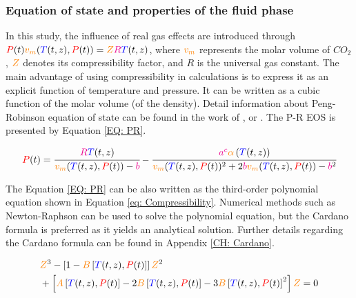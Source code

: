 \documentclass[../Article_Model_Parameters.tex]{subfiles}
\begin{document}
	
	\label{CH: Thermodynamic_details}
	
	\subsubsection{Equation of state and properties of the fluid phase} \label{subsubsec: Equation of state}
	In this study, the influence of real gas effects are introduced through ${\color{red}P}(t) {\color{orange}v_m}({\color{blue}T}(t,z),{\color{red}P}(t)) = {\color{orange}Z}{\color{magenta}R}{\color{blue}T}(t,z)$, where ${\color{orange}v_m}$ represents the molar volume of $CO_2$, ${\color{orange}Z}$ denotes its compressibility factor, and $R$ is the universal gas constant. The main advantage of using compressibility in calculations is to express it as an explicit function of temperature and pressure. It can be written as a cubic function of the molar volume (of the density). Detail information about Peng-Robinson equation of state can be found in the work of \citet{Peng1976}, \citet{Elliott2011} or \citet{Pratt2001}. The P-R EOS is presented by Equation \ref{EQ: PR}.
	
	{\footnotesize
		\begin{equation}
			{\color{red}P}(t) = \cfrac{{\color{magenta}R}{\color{blue}T}(t,z)}{{\color{orange}v_m}({\color{blue}T}(t,z),{\color{red}P}(t)) - {\color{magenta}b}} - \cfrac{{\color{magenta}a^c}{\color{orange}\alpha}\left({\color{blue}T}(t,z)\right)}{{\color{orange}v_m}({\color{blue}T}(t,z),{\color{red}P}(t))^2 + 2{\color{magenta}b}{\color{orange}v_m}({\color{blue}T}(t,z),{\color{red}P}(t)) - {\color{magenta}b}^2}
			\label{EQ: PR}
		\end{equation}
	}

	The Equation \ref{EQ: PR} can be also written as the third-order polynomial equation shown in Equation \ref{eq: Compressibility}. Numerical methods such as Newton-Raphson can be used to solve the polynomial equation, but the Cardano formula is preferred as it yields an analytical solution. Further details regarding the Cardano formula can be found in Appendix \ref{CH: Cardano}.
	
	{\footnotesize	
	\begin{align}\label{eq: Compressibility}
		&{\color{orange}Z}^3 - \left[1 - {\color{orange}B}\left[{\color{blue}T}(t,z), {\color{red}P}(t)\right]\right] {\color{orange}Z}^2 \\ \nonumber
		&+ \left[{\color{orange}A}\left[{\color{blue}T}(t,z), {\color{red}P}(t)\right] - 2{\color{orange}B}\left[{\color{blue}T}(t,z), {\color{red}P}(t)\right] - 3{\color{orange}B}\left[{\color{blue}T}(t,z), {\color{red}P}(t)\right]^2\right] {\color{orange}Z} = 0
	\end{align} }
\end{document}
